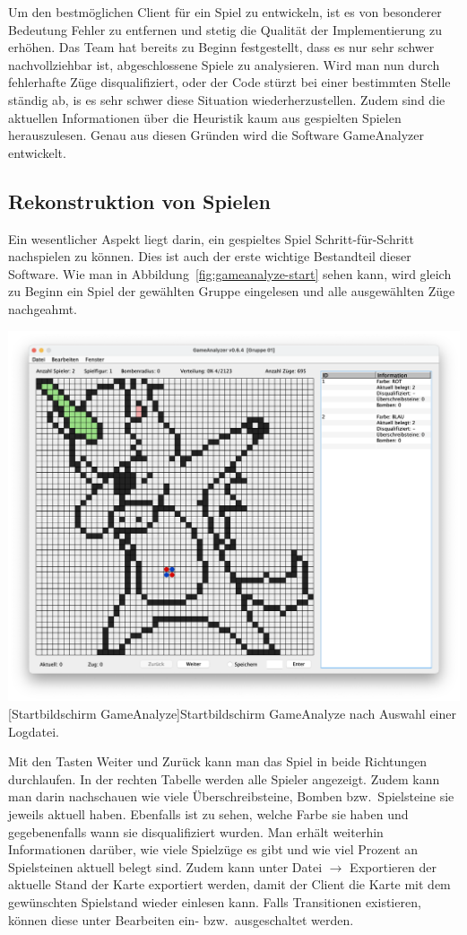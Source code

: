 Um den bestm\"oglichen Client f\"ur ein Spiel zu entwickeln, ist es von besonderer Bedeutung Fehler zu entfernen und stetig die Qualit\"at der Implementierung zu erh\"ohen.
Das Team hat bereits zu Beginn festgestellt, dass es nur sehr schwer nachvollziehbar ist, abgeschlossene Spiele zu analysieren.
Wird man nun durch fehlerhafte Z\"uge disqualifiziert, oder der Code st\"urzt bei einer bestimmten Stelle st\"andig ab, is es sehr schwer diese Situation wiederherzustellen.
Zudem sind die aktuellen Informationen \"uber die Heuristik kaum aus gespielten Spielen herauszulesen.
Genau aus diesen Gr\"unden wird die Software GameAnalyzer entwickelt.

\subsection{Rekonstruktion von Spielen}\label{subsec:rekonstruktion-von-spielen}
Ein wesentlicher Aspekt liegt darin, ein gespieltes Spiel Schritt-f\"ur-Schritt nachspielen zu k\"onnen.
Dies ist auch der erste wichtige Bestandteil dieser Software.
Wie man in Abbildung~\ref{fig:gameanalyze-start} sehen kann, wird gleich zu Beginn ein Spiel der gew\"ahlten Gruppe eingelesen und alle ausgew\"ahlten Z\"uge nachgeahmt.

\vspace{1em}
\begin{minipage}{\linewidth}
    \centering
    \includegraphics[width=0.8\linewidth]{pics/startscreen}
    [Startbildschirm GameAnalyze]{Startbildschirm GameAnalyze nach Auswahl einer Logdatei.}
    \label{fig:gameanalyze-start}
\end{minipage}

Mit den Tasten Weiter und Zur\"uck kann man das Spiel in beide Richtungen durchlaufen.
In der rechten Tabelle werden alle Spieler angezeigt.
Zudem kann man darin nachschauen wie viele \"Uberschreibsteine, Bomben bzw.\ Spielsteine sie jeweils aktuell haben.
Ebenfalls ist zu sehen, welche Farbe sie haben und gegebenenfalls wann sie disqualifiziert wurden.
Man erh\"alt weiterhin Informationen dar\"uber, wie viele Spielz\"uge es gibt und wie viel Prozent an Spielsteinen aktuell belegt sind.
Zudem kann unter Datei $\rightarrow$ Exportieren der aktuelle Stand der Karte exportiert werden, damit der Client die Karte mit dem gew\"unschten Spielstand wieder einlesen kann.
Falls Transitionen existieren, k\"onnen diese unter Bearbeiten ein- bzw.\ ausgeschaltet werden.

